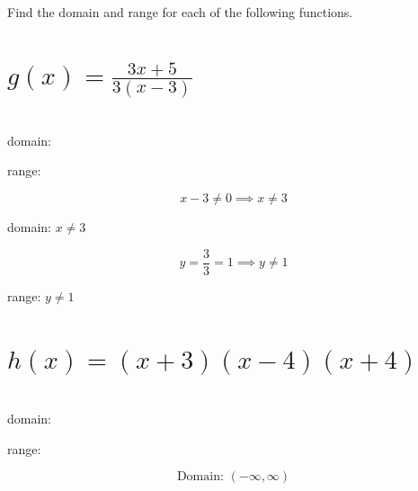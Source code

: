 \documentclass[11pt]{exam}
\begin{document}
\addpoints


\blankpage



\newpage


\begin{questions}
\headerbox{\oca}

\question
Find the domain and range for each of the following functions.\\
\begin{parts}
    \part[5]{\(\displaystyle{ g(x) = \displaystyle \frac{3x + 5}{3(x - 3)} }\)}\\
    
         domain: \fillin[][2in]\\\vspace{12pt}
        
         range: \fillin[][2in]\\
\begin{solution}
\[x - 3 \neq 0 \implies x \neq 3\]

domain: \(\boxed{ x \neq 3 }\)

\[y = \frac{3}{3} = 1 \implies y \neq 1\]

range: \(\boxed{ y \neq 1 }\)
\end{solution}
    \part[5]{\(\displaystyle{ h(x) = (x + 3)(x - 4)(x + 4) }\)}\\ 
    
         domain: \fillin[][2in]\\\vspace{12pt}
        
         range: \fillin[][2in]\\
\begin{solution}
\[\text{Domain: } (-\infty, \infty)\]


\end{solution}
\end{parts}
\end{questions}
\end{document}
